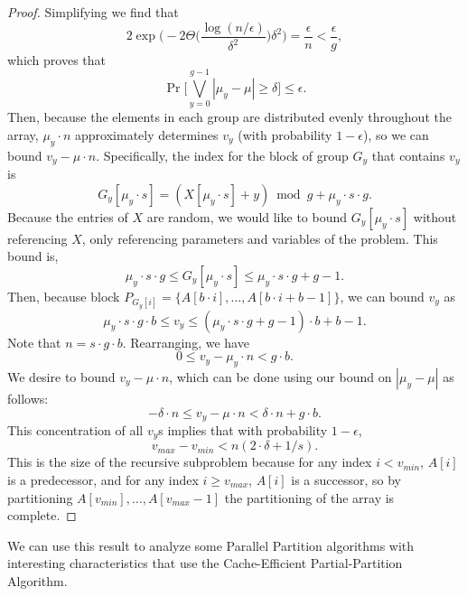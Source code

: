 \documentclass[sigconf]{acmart}
\theoremstyle{remark}
\theoremstyle{remark}
\begin{document}
\begin{proof}
	Simplifying we find that  
	$$2\exp\Big(-2 \Theta\Big(\frac{\log (n/\epsilon)}{\delta^2}\Big) \delta^2\Big) = \frac{\epsilon}{n} < \frac{\epsilon}{g},$$
	which proves that 
	$$\Pr\Big[\bigvee_{y=0}^{g-1} |\mu_y - \mu| \geq \delta\Big] \leq \epsilon.$$
	Then, because the elements in each group are distributed evenly throughout the array, $\mu_y\cdot n$ approximately determines $v_y$ (with probability $1-\epsilon$), so we can bound $v_y-\mu\cdot n$. 
	Specifically, the index for the block of group $G_y$ that contains $v_y$ is $$G_y[\mu_y\cdot s]= (X[\mu_y \cdot s] + y) \bmod g + \mu_y \cdot s\cdot g.$$
	Because the entries of $X$ are random, we would like to bound $G_y[\mu_y\cdot s]$ without referencing $X$, only referencing parameters and variables of the problem.
	This bound is, 
	$$ \mu_y \cdot s\cdot g \leq G_y[\mu_y\cdot s] \leq  \mu_y \cdot s\cdot g + g-1.$$
	Then, because block $P_{G_y[i]} = \{A[b\cdot i], \ldots, A[b\cdot i + b-1]\}$, we can bound $v_y$ as $$\mu_y\cdot s\cdot g\cdot b \leq v_y \leq (\mu_y \cdot s\cdot g + g-1)\cdot b + b-1.$$
	Note that $n=s\cdot g\cdot b$. 
	Rearranging, we have 
	$$0 \leq v_y- \mu_y\cdot n < g\cdot b.$$
	We desire to bound $v_y-\mu\cdot n$, which can be done using our bound on $|\mu_y - \mu|$ as follows:
	$$ - \delta\cdot n \leq v_y - \mu\cdot n < \delta\cdot n + g\cdot b.$$
	This concentration of all $v_y$s implies that with probability $1-\epsilon$, 
	$$v_{max}-v_{min}<n(2\cdot\delta + 1/s).$$ 
	This is the size of the recursive subproblem because for any index $i < v_{min}$, $A[i]$ is a predecessor, and for any index $i \geq v_{max}$, $A[i]$ is a successor, so by partitioning $A[v_{min}], \ldots, A[v_{max}-1]$ the partitioning of the array is complete.
\end{proof}
We can use this result to analyze some Parallel Partition algorithms with interesting characteristics that use the Cache-Efficient Partial-Partition Algorithm.
\end{document}
